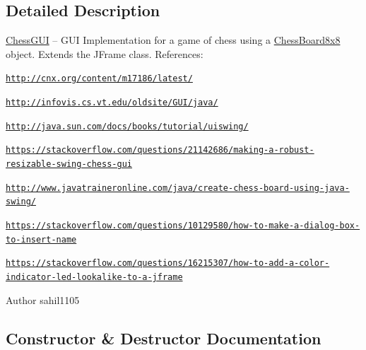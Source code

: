 \subsection{Detailed Description}
\mbox{\hyperlink{class_chess_g_u_i}{Chess\+G\+UI}} -- G\+UI Implementation for a game of chess using a \mbox{\hyperlink{class_chess_board8x8}{Chess\+Board8x8}} object. Extends the J\+Frame class. References\+:
\begin{DoxyEnumerate}
\item \href{http://cnx.org/content/m17186/latest/}{\tt http\+://cnx.\+org/content/m17186/latest/}
\item \href{http://infovis.cs.vt.edu/oldsite/GUI/java/}{\tt http\+://infovis.\+cs.\+vt.\+edu/oldsite/\+G\+U\+I/java/}
\item \href{http://java.sun.com/docs/books/tutorial/uiswing/}{\tt http\+://java.\+sun.\+com/docs/books/tutorial/uiswing/}
\item \href{https://stackoverflow.com/questions/21142686/making-a-robust-resizable-swing-chess-gui}{\tt https\+://stackoverflow.\+com/questions/21142686/making-\/a-\/robust-\/resizable-\/swing-\/chess-\/gui}
\item \href{http://www.javatraineronline.com/java/create-chess-board-using-java-swing/}{\tt http\+://www.\+javatraineronline.\+com/java/create-\/chess-\/board-\/using-\/java-\/swing/}
\item \href{https://stackoverflow.com/questions/10129580/how-to-make-a-dialog-box-to-insert-name}{\tt https\+://stackoverflow.\+com/questions/10129580/how-\/to-\/make-\/a-\/dialog-\/box-\/to-\/insert-\/name}
\item \href{https://stackoverflow.com/questions/16215307/how-to-add-a-color-indicator-led-lookalike-to-a-jframe}{\tt https\+://stackoverflow.\+com/questions/16215307/how-\/to-\/add-\/a-\/color-\/indicator-\/led-\/lookalike-\/to-\/a-\/jframe}
\end{DoxyEnumerate}

\begin{DoxyAuthor}{Author}
sahil1105 
\end{DoxyAuthor}


\subsection{Constructor \& Destructor Documentation}
\mbox{\label{class_chess_g_u_i_a3ec1066101fd275f05c2579d120af460}} 
